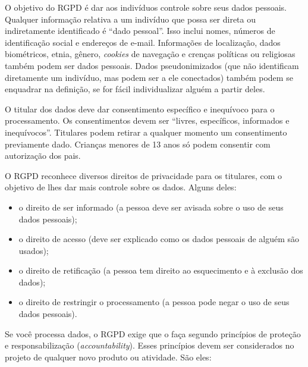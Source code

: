 \documentclass[
  11pt,
]{article}
\providecommand{\tightlist}{%
  \setlength{\itemsep}{0pt}\setlength{\parskip}{0pt}}
\begin{document}
O objetivo do RGPD é dar aos indivíduos controle sobre seus dados
pessoais. Qualquer informação relativa a um indivíduo que possa ser
direta ou indiretamente identificado é ``dado pessoal''. Isso inclui
nomes, números de identificação social e endereços de e-mail.
Informações de localização, dados biométricos, etnia, gênero,
\emph{cookies} de navegação e crenças políticas ou religiosas também
podem ser dados pessoais. Dados pseudonimizados (que não identificam
diretamente um indivíduo, mas podem ser a ele conectados) também podem
se enquadrar na definição, se for fácil individualizar alguém a partir
deles.

O titular dos dados deve dar consentimento específico e inequívoco para
o processamento. Os consentimentos devem ser ``livres, específicos,
informados e inequívocos''. Titulares podem retirar a qualquer momento
um consentimento previamente dado. Crianças menores de 13 anos só podem
consentir com autorização dos pais.

O RGPD reconhece diversos direitos de privacidade para os titulares, com
o objetivo de lhes dar mais controle sobre os dados. Alguns deles:

\begin{itemize}
\tightlist
\item
  o direito de ser informado (a pessoa deve ser avisada sobre o uso de
  seus dados pessoais);
\item
  o direito de acesso (deve ser explicado como os dados pessoais de
  alguém são usados);
\item
  o direito de retificação (a pessoa tem direito ao esquecimento e à
  exclusão dos dados);
\item
  o direito de restringir o processamento (a pessoa pode negar o uso de
  seus dados pessoais).
\end{itemize}

Se você processa dados, o RGPD exige que o faça segundo princípios de
proteção e responsabilização (\emph{accountability}). Esses princípios
devem ser considerados no projeto de qualquer novo produto ou atividade.
São eles:
\end{document}
